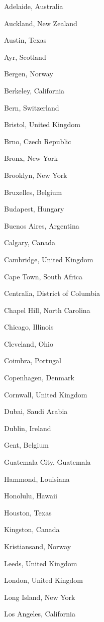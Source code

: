 \documentclass[20pt,landscape]{foils}
\begin{document}
\begin{list1}
  \begin{list2}
  \item Adelaide, Australia
  \item Auckland, New Zealand
  \item Austin, Texas
  \item Ayr, Scotland
  \item Bergen, Norway
  \item Berkeley, California
  \item Bern, Switzerland
  \item Bristol, United Kingdom
  \item Brno, Czech Republic
  \item Bronx, New York
  \item Brooklyn, New York
  \item Bruxelles, Belgium
  \item Budapest, Hungary
  \item Buenos Aires, Argentina
  \item Calgary, Canada
  \item Cambridge, United Kingdom
  \item Cape Town, South Africa
  \item Centralia, District of Columbia
  \item Chapel Hill, North Carolina
  \item Chicago, Illinois
  \item Cleveland, Ohio
  \item Coimbra, Portugal
  \item Copenhagen, Denmark
  \item Cornwall, United Kingdom
  \item Dubai, Saudi Arabia
  \item Dublin, Ireland
  \item Gent, Belgium
  \item Guatemala City, Guatemala
  \item Hammond, Louisiana
  \item Honolulu, Hawaii
  \item Houston, Texas
  \item Kingston, Canada
  \item Kristiansand, Norway
  \item Leeds, United Kingdom
  \item London, United Kingdom
  \item Long Island, New York
  \item Los Angeles, California

\end{list2}
\end{list1}
\end{document}
